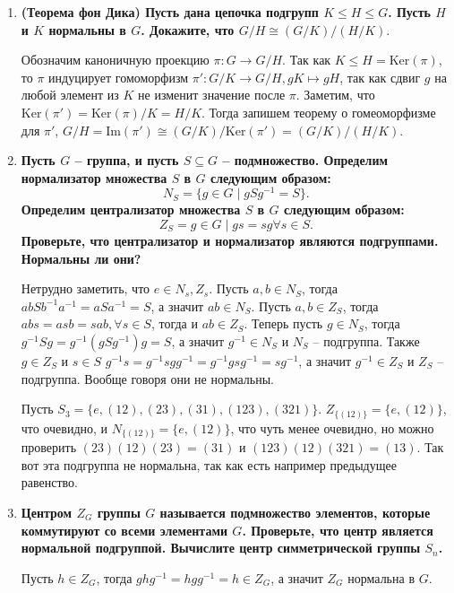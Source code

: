 \documentclass{article}
\begin{document}
\begin{enumerate}
    \item \textbf{(Теорема фон Дика) Пусть дана цепочка подгрупп $K\leq H\leq 
        G$. Пусть $H$ и $K$ нормальны в $G$. Докажите, что $G/H\cong (G/K)/(H/K).$}

        Обозначим каноничную проекцию $\pi: G\longrightarrow G/H$. Так как $K
        \leq H=\text{Ker}(\pi)$, то $\pi$ индуцирует гомоморфизм $\pi':
        G/K\longrightarrow G/H, gK\mapsto gH$, так как сдвиг $g$ на любой элемент
        из $K$ не изменит значение после $\pi$. Заметим, что $\text{Ker}(\pi')=
        \text{Ker}(\pi)/K = H/K$. Тогда запишем теорему о гомеоморфизме для $\pi'$,
        $G/H=\text{Im}(\pi')\cong(G/K)/\text{Ker}(\pi')=(G/K)/(H/K)$.

    \item \textbf{Пусть $G$ – группа, и пусть $S\subseteq G$ – подмножество.
        Определим нормализатор множества $S$ в $G$ следующим образом:
        \[N_S=\{g\in G\;|\;gSg^{−1}=S\}.\]
        Определим централизатор множества $S$ в $G$ следующим образом:
        \[Z_S ={g\in G\;|\;gs=sg\forall s\in S}.\]
        Проверьте, что централизатор и нормализатор являются подгруппами.
        Нормальны ли они?}

        Нетрудно заметить, что $e\in N_s,Z_s$. Пусть $a,b\in N_S$, тогда
        $abSb^{-1}a^{-1}=aSa^{-1}=S$, а значит $ab\in N_S$.
        Пусть $a,b\in Z_S$, тогда $abs=asb=sab, \forall s\in S$, тогда и $ab\in
        Z_S$. Теперь пусть $g\in N_S$, тогда $g^{-1}Sg=g^{-1}(gSg^{-1})g=S$,
        а значит $g^{-1}\in N_S$ и $N_S$ – подгруппа. Также $g\in Z_S$ и $s\in S$
        $g^{-1}s = g^{-1}sgg^{-1} = g^{-1}gsg^{-1}=sg^{-1}$, а значит $g^{-1}\in Z_S$
        и $Z_S$ – подгруппа. Вообще говоря они не нормальны.
        
        Пусть $S_3=\{e,(12),(23),(31),(123),(321)\}$. $Z_{\{(12)\}}=\{e,(12)\}$,
        что очевидно, и $N_{\{(12)\}}=\{e,(12)\}$, что чуть менее очевидно, но
        можно проверить $(23)(12)(23)=(31)$ и $(123)(12)(321)=(13)$. Так вот
        эта подгруппа не нормальна, так как есть например предыдущее равенство.

    \item \textbf{Центром $Z_G$ группы $G$ называется подмножество элементов,
        которые коммутируют со всеми элементами $G$. Проверьте, что центр
        является нормальной подгруппой. Вычислите центр симметрической группы
        $S_n$.}

        Пусть $h\in Z_G$, тогда $ghg^{-1}=hgg^{-1}=h\in Z_G$, а значит $Z_G$
        нормальна в $G$.


\end{enumerate}
\end{document}
